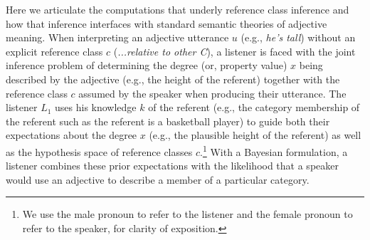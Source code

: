 \documentclass[doc, floatsintext]{apa6}
\begin{document}
Here we articulate the computations that underly reference class inference and how that inference interfaces with standard semantic theories of adjective meaning.
When interpreting an adjective utterance $u$  (e.g., \emph{he's tall}) without an explicit reference class $c$ (\emph{...relative to other C}), a listener is faced with the joint inference problem of determining the degree (or, property value) $x$  being described by the adjective (e.g., the height of the referent) together with the reference class $c$ assumed by the speaker when producing their utterance.
The listener $L_1$  uses his knowledge $k$ of the referent (e.g., the category membership of the referent such as the referent is a basketball player) to guide both their expectations about the degree $x$ (e.g., the plausible height of the referent) as well as the hypothesis space of reference classes $c$.\footnote{We use the male pronoun to refer to the listener and the female pronoun to refer to the speaker, for clarity of exposition.}
With a Bayesian formulation, a listener combines these prior expectations with the likelihood that a speaker would use an adjective to describe a member of a particular category.



\end{document}
